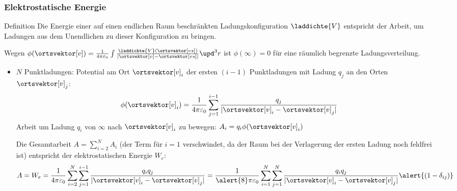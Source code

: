 
\begin{frame}
  \frametitle{Elektrostatische Energie}
  \begin{block}{Definition}
    Die \alert{Energie} einer auf einen \alert{endlichen Raum} beschränkten
    Ladungskonfiguration $\laddichte{V}$ entspricht der Arbeit, um
    Ladungen aus dem Unendlichen zu dieser Konfiguration zu bringen.

    Wegen $\phi(\ortsvektor[v]) =
    \frac{1}{4\pi\varepsilon_0}\int\frac{\laddichte{V}(\ortsvektor[vs])}{\left|\ortsvektor[v]-\ortsvektor[vs]\right|}
    \upd^3r$ ist \alert{$\phi(\infty) = 0$} für eine räumlich begrenzte Ladungsverteilung.
  \end{block}
  \begin{itemize}[<+->]
  \item $N$ Punktladungen: Potential am Ort $\ortsvektor[v]_i$ der ersten $(i-1)$ Punktladungen
    mit Ladung $q_j$ an den Orten $\ortsvektor[v]_j$:
    $$
    \phi(\ortsvektor[v]_i) = \frac{1}{4\pi\varepsilon_0} \sum_{j=1}^{i-1}
    \frac{q_j}{|\ortsvektor[v]_i - \ortsvektor[v]_j|}
    $$
    Arbeit um Ladung $q_i$ von $\infty$ nach $\ortsvektor[v]_i$ zu bewegen: $A_i = q_i\phi(\ortsvektor[v]_i)$

    Die Gesamtarbeit $A = \sum_{i=2}^N A_i$ (der Term für $i=1$
    verschwindet, da der Raum bei der Verlagerung der ersten Ladung
    noch feldfrei ist) entspricht der \alert{elektrostatischen
      Energie} $W_e$:
    $$A = W_e = \frac{1}{4\pi\varepsilon_0} \sum_{i=2}^N \sum_{j=1}^{i-1}
    \frac{q_i q_j}{|\ortsvektor[v]_i - \ortsvektor[v]_j|} = \frac{1}{\alert{8}\pi\varepsilon_0} \sum_{i=1}^N \sum_{j=1}^{N}
    \frac{q_i q_j}{|\ortsvektor[v]_i - \ortsvektor[v]_j|} \alert{(1-\delta_{ij})}
    $$
    \end{itemize}
  \end{frame}
